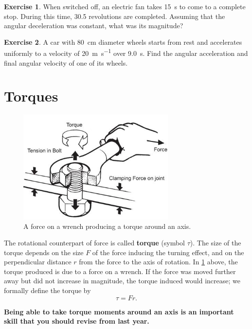 \documentclass[a4paper]{amsbook}
\theoremstyle{definition}
\newtheorem{exercise}{Exercise}
\numberwithin{exercise}{chapter}
\numberwithin{exercise}{chapter}
\begin{document}
\begin{exercise}
  When switched off, an electric fan takes \SI{15}{\second} to come to a complete stop. During this time,
  30.5 revolutions are completed. Assuming that the angular deceleration was constant, what was its magnitude?
\end{exercise}

\begin{exercise}
  A car with \SI{80}{\centi\metre} diameter wheels starts from rest and accelerates uniformly to a velocity of \SI{20}{\metre\per\second}
  over \SI{9.0}{\second}. Find the angular acceleration and final angular velocity of one of its wheels.
\end{exercise}

\section{Torques}
\begin{figure}
  \centering
  \includegraphics[width=0.7\textwidth]{torque}
  \caption{A force on a wrench producing a torque around an axis.\label{fig:torque}}
\end{figure}
The rotational counterpart of force is called \textbf{torque} (symbol $ \tau $). The size of the torque depends
on the size $ F $ of the force inducing the turning effect, and on the perpendicular distance $ r $ from the force
to the axis of rotation. In \cref{fig:torque} above, the torque produced is due to a force on a wrench. If the
force was moved further away but did not increase in magnitude, the torque induced would increase; we formally
define the torque by
\begin{equation}
  \tau = Fr.
\end{equation}

\textbf{Being able to take torque moments around an axis is an important skill that you should revise from last year.}
\end{document}
